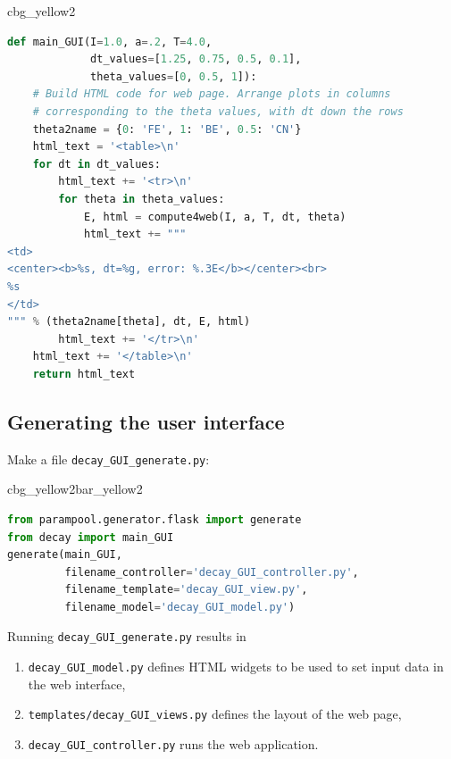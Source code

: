 \documentclass[%
oneside,                 %
final,                   %
10pt]{article}
\newenvironment{_cod_tight}[1]{
   \def\FrameCommand{\colorbox{#1}}
   \FrameRule0.6pt\MakeFramed {\FrameRestore}\vskip3mm}
   {\vskip0mm\endMakeFramed}
\newenvironment{cod}[1]{
\bgroup\rmfamily
\fboxsep=0mm\relax
\begin{_cod_tight}{#1}
\list{}{\parsep=-2mm\parskip=0mm\topsep=0pt\leftmargin=2mm
\rightmargin=2\leftmargin\leftmargin=4pt\relax}
\item\relax}
{\endlist\end{_cod_tight}\egroup}
\newenvironment{_pro_tight}[2]{
   \def\FrameCommand{\color{#2}\vrule width 1mm\normalcolor\colorbox{#1}}
   \FrameRule0.6pt\MakeFramed {\advance\hsize-2mm\FrameRestore}\vskip3mm}
   {\vskip0mm\endMakeFramed}
\newenvironment{pro}[2]{
\bgroup\rmfamily
\fboxsep=0mm\relax
\begin{_pro_tight}{#1}{#2}
\list{}{\parsep=-2mm\parskip=0mm\topsep=0pt\leftmargin=2mm
\rightmargin=2\leftmargin\leftmargin=4pt\relax}
\item\relax}
{\endlist\end{_pro_tight}\egroup}
\begin{document}
\begin{cod}{cbg_yellow2}\begin{lstlisting}[language=Python,style=simple,xleftmargin=2mm]
def main_GUI(I=1.0, a=.2, T=4.0,
             dt_values=[1.25, 0.75, 0.5, 0.1],
             theta_values=[0, 0.5, 1]):
    # Build HTML code for web page. Arrange plots in columns
    # corresponding to the theta values, with dt down the rows
    theta2name = {0: 'FE', 1: 'BE', 0.5: 'CN'}
    html_text = '<table>\n'
    for dt in dt_values:
        html_text += '<tr>\n'
        for theta in theta_values:
            E, html = compute4web(I, a, T, dt, theta)
            html_text += """
<td>
<center><b>%s, dt=%g, error: %.3E</b></center><br>
%s
</td>
""" % (theta2name[theta], dt, E, html)
        html_text += '</tr>\n'
    html_text += '</table>\n'
    return html_text
\end{lstlisting}\end{cod}
\noindent


\subsection*{Generating the user interface}

Make a file \Verb!decay_GUI_generate.py!:

\begin{pro}{cbg_yellow2}{bar_yellow2}\begin{lstlisting}[language=Python,style=simple,xleftmargin=2mm]
from parampool.generator.flask import generate
from decay import main_GUI
generate(main_GUI,
         filename_controller='decay_GUI_controller.py',
         filename_template='decay_GUI_view.py',
         filename_model='decay_GUI_model.py')
\end{lstlisting}\end{pro}
\noindent

Running \Verb!decay_GUI_generate.py! results in

\begin{enumerate}
 \item \Verb!decay_GUI_model.py! defines HTML widgets to be used to set
    input data in the web interface,

 \item \Verb!templates/decay_GUI_views.py! defines the layout of the web page,

 \item \Verb!decay_GUI_controller.py! runs the web application.
\end{enumerate}
\end{document}

